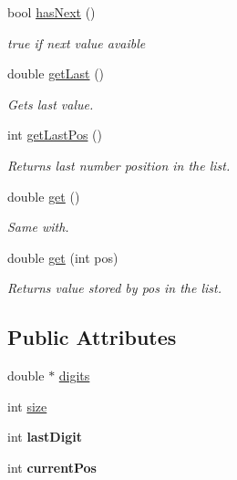 \begin{DoxyCompactItemize}
\item 
bool \hyperlink{class_digits_list_a0494cb6bf482dbdfb45450e0ed9d3261}{has\+Next} ()
\begin{DoxyCompactList}\small\item\em true if next value avaible \end{DoxyCompactList}\item 
double \hyperlink{class_digits_list_a41466643c41254be527aa5f17d1989bd}{get\+Last} ()
\begin{DoxyCompactList}\small\item\em Gets last value. \end{DoxyCompactList}\item 
int \hyperlink{class_digits_list_a36af51d541c102211cd7074b3d16c5f6}{get\+Last\+Pos} ()
\begin{DoxyCompactList}\small\item\em Returns last number position in the list. \end{DoxyCompactList}\item 
double \hyperlink{class_digits_list_a17be0b253cd525d4eff97af9d780ad72}{get} ()
\begin{DoxyCompactList}\small\item\em Same with. \end{DoxyCompactList}\item 
double \hyperlink{class_digits_list_ab9ec988cf479472b1856524c3acaf3ca}{get} (int pos)
\begin{DoxyCompactList}\small\item\em Returns value stored by pos in the list. \end{DoxyCompactList}\end{DoxyCompactItemize}
\subsection*{Public Attributes}
\begin{DoxyCompactItemize}
\item 
double $\ast$ \hyperlink{class_digits_list_ade233072d05a290c8dae6f76f9551831}{digits}
\item 
int \hyperlink{class_digits_list_ae1e9517bd687d1b2727e84a80416b192}{size}
\item 
\hypertarget{class_digits_list_ab4978c206993f2a2f382d3f2646daded}{}int {\bfseries last\+Digit}\label{class_digits_list_ab4978c206993f2a2f382d3f2646daded}

\item 
\hypertarget{class_digits_list_a90a7daaca5877e9c9037af8449e71b68}{}int {\bfseries current\+Pos}\label{class_digits_list_a90a7daaca5877e9c9037af8449e71b68}

\end{DoxyCompactItemize}


